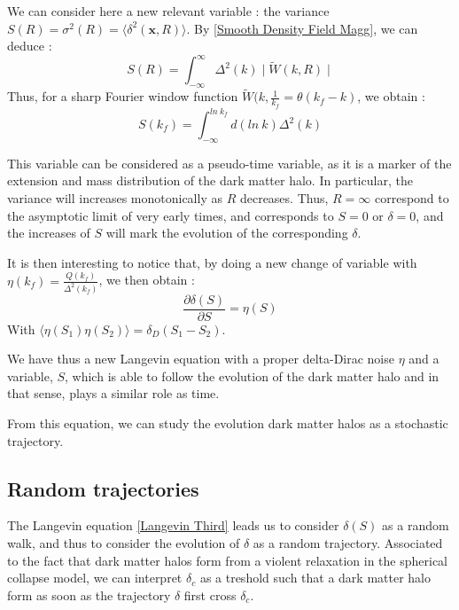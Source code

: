 We can consider here a new relevant variable : the variance $S(R) = \sigma^2(R) = \langle \delta^2(\textbf{x},R) \rangle$. By \ref{Smooth Density Field Magg}, we can deduce :
\begin{equation}
\label{S var 2}
S(R) = \int^\infty_{-\infty} \Delta^2(k) \mid \widetilde{W}(k,R) \mid
\end{equation}
Thus, for a sharp Fourier window function $\widetilde{W}(k, \frac{1}{k_f} = \theta(k_f - k)$, we obtain :
\begin{equation}
\label{S var}
S(k_f) = \int_{-\infty}^{ln \ k_f} d(ln \ k) \Delta^2(k)
\end{equation}

This variable can be considered as a pseudo-time variable, as it is a marker of the extension and mass distribution of the dark matter halo. In particular, the variance will increases monotonically as $R$ decreases. Thus, $R=\infty$ correspond to the asymptotic limit of very early times, and corresponds to $S=0$ or $\delta = 0$, and the increases of $S$ will mark the evolution of the corresponding $\delta$.

It is then interesting to notice that, by doing a new change of variable with $\eta(k_f) = \frac{Q(k_f)}{\Delta^2(k_f)}$, we then obtain :
\begin{equation}
\label{Langevin Third}
\frac{\partial \delta(S)}{\partial S} = \eta(S)
\end{equation}
With $\langle \eta (S_1) \eta (S_2) \rangle = \delta_D (S_1 - S_2)$.

We have thus a new Langevin equation with a proper delta-Dirac noise $\eta$ and a variable, $S$, which is able to follow the evolution of the dark matter halo and in that sense, plays a similar role as time.

From this equation, we can study the evolution dark matter halos as a stochastic trajectory.

\subsection{Random trajectories}

The Langevin equation \ref{Langevin Third} leads us to consider $\delta(S)$ as a random walk, and thus to consider the evolution of $\delta$ as a random trajectory. Associated to the fact that dark matter halos form from a violent relaxation in the spherical collapse model, we can interpret $\delta_c$ as a treshold such that a dark matter halo form as soon as the trajectory $\delta$ first cross $\delta_c$.

